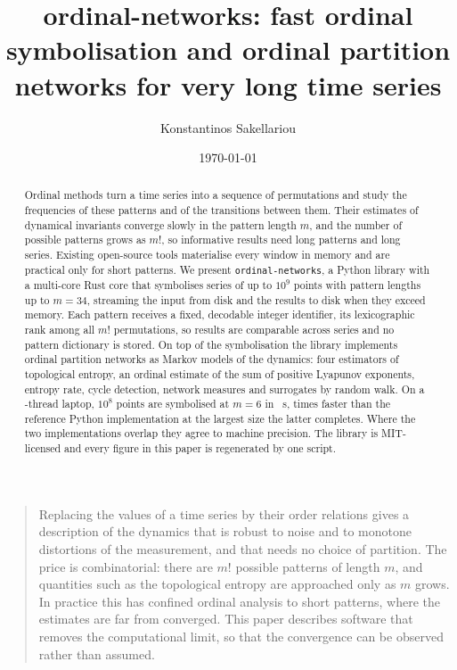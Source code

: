 \documentclass[aip,cha,reprint,amsmath,amssymb]{revtex4-2}
\newcommand{\pkg}{\texttt{ordinal-networks}}
\newcommand{\TODO}[1]{\textbf{[TODO: #1]}}
\begin{document}
\title{ordinal-networks: fast ordinal symbolisation and ordinal partition networks for very long time series}

\author{Konstantinos Sakellariou}
\email{\TODO{corresponding e-mail}}
\affiliation{\TODO{affiliation}}

\date{\today}

\begin{abstract}
Ordinal methods turn a time series into a sequence of permutations and study the
frequencies of these patterns and of the transitions between them. Their estimates of
dynamical invariants converge slowly in the pattern length $m$, and the number of
possible patterns grows as $m!$, so informative results need long patterns and long
series. Existing open-source tools materialise every window in memory and are practical
only for short patterns. We present \pkg{}, a Python library with a multi-core Rust
core that symbolises series of up to $10^9$ points with pattern lengths up to $m = 34$,
streaming the input from disk and the results to disk when they exceed memory. Each
pattern receives a fixed, decodable integer identifier, its lexicographic rank among all
$m!$ permutations, so results are comparable across series and no pattern dictionary is
stored. On top of the symbolisation the library implements ordinal partition networks as
Markov models of the dynamics: four estimators of topological entropy, an ordinal
estimate of the sum of positive Lyapunov exponents, entropy rate, cycle detection,
network measures and surrogates by random walk. On a \nCores-thread laptop, $10^{8}$
points are symbolised at $m = 6$ in \tOnEight~s, \speedupN{} times faster than the
reference Python implementation at the largest size the latter completes. Where the two
implementations overlap they agree to machine precision. The library is MIT-licensed and
every figure in this paper is regenerated by one script.
\end{abstract}

\maketitle

\begin{quotation}
Replacing the values of a time series by their order relations gives a description of
the dynamics that is robust to noise and to monotone distortions of the measurement, and
that needs no choice of partition. The price is combinatorial: there are $m!$ possible
patterns of length $m$, and quantities such as the topological entropy are approached
only as $m$ grows. In practice this has confined ordinal analysis to short patterns,
where the estimates are far from converged. This paper describes software that removes
the computational limit, so that the convergence can be observed rather than assumed.
\end{quotation}
\end{document}
